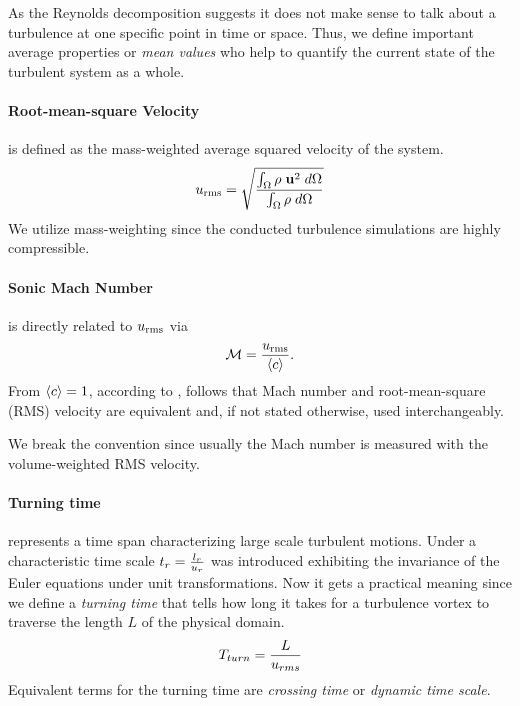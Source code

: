 As the Reynolds decomposition suggests it does not make sense to talk about a
turbulence at one specific point in time or space. Thus, we define important
average properties or \emph{mean values} who help to quantify the current
state of the turbulent system as a whole.

\paragraph{Root-mean-square Velocity}
is defined as the mass-weighted average squared velocity of the system.
\begin{equation}
    u_{\text{rms}} = \sqrt{\frac{\int_\Omega \rho \; \mathbf{u}^2 \; d\Omega}{\int_\Omega \rho \; d\Omega}}
\end{equation}
We utilize mass-weighting since the conducted turbulence
simulations are highly compressible.

\paragraph{Sonic Mach Number}
is directly related to $u_{\text{rms}}$ via
\begin{equation}
\mathcal{M} = \frac{u_{\text{rms}}}{\left\langle c\right\rangle}.
\end{equation}
From $\left\langle c\right\rangle = 1$, according to , follows that
Mach number and root-mean-square (RMS) velocity are equivalent and, if not stated
otherwise, used interchangeably.

\remark We break the convention since usually the Mach number is measured with
the volume-weighted RMS velocity.

\paragraph{Turning time}
represents a time span characterizing large scale turbulent motions. Under
 a characteristic time scale $t_r =
\frac{l_r}{u_r}$ was introduced exhibiting the invariance of the Euler equations 
under unit transformations. Now it gets a practical meaning since we define a
\emph{turning time} that tells how long it takes for a turbulence vortex to
traverse the length $L$ of the physical domain.
\begin{equation}
\label{eqn:dyn-time}
    T_{turn} = \frac{L}{u_{rms}}
\end{equation}
Equivalent terms for the turning time are \emph{crossing time} or \emph{dynamic
time scale}.


